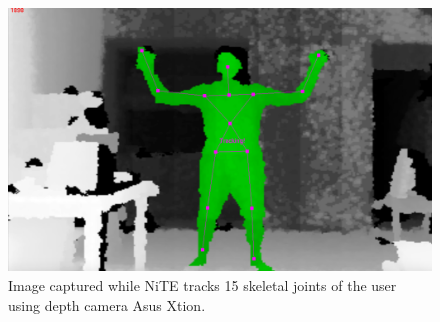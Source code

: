 \begin{figure}
	[h] \centering 
	\includegraphics[width=145mm]{figures/content/ni-skeleton.jpg} \caption{Image captured while NiTE tracks 15 skeletal joints of the user using depth camera Asus Xtion. } \label{fg:ni:skeleton} 
\end{figure}
